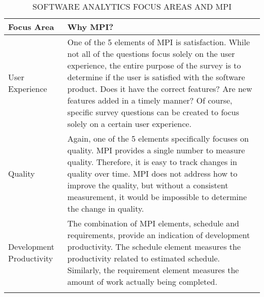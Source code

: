 \documentclass[SDSUThesis.tex]{subfiles}
\begin{document}
        \begin{longtable}{p{3cm}p{11cm}}
            
            \toprule%
             \centering%
             {\bfseries Focus Area}
             & {\bfseries Why MPI?} \\
            
            \cmidrule[0.4pt](r{0.125em}){1-1}%
            \cmidrule[0.4pt](lr{0.125em}){2-2}%
            \endhead
            
            User Experience & One of the 5 elements of MPI is satisfaction.  While not all of the questions focus solely on the user experience, the entire purpose of the survey is to determine if the user is satisfied
            with the software product. Does it have the correct features? Are new features added in a timely manner? Of course, specific survey questions can be created to focus solely on a certain user experience. \\
            \myrowcolour%
            Quality & Again, one of the 5 elements specifically focuses on quality.  MPI provides a single number
            to measure quality.  Therefore, it is easy to track changes in quality over time.  MPI does not address
            how to improve the quality, but without a consistent measurement, it would be impossible to determine the change in quality. \\
            Development Productivity & The combination of MPI elements, schedule and requirements, provide an 
            indication of development productivity. The schedule element measures the productivity
            related to estimated schedule. Similarly, the requirement element measures the amount of
            work actually being completed.  \\
            
            \bottomrule
            
            \caption{SOFTWARE ANALYTICS FOCUS AREAS AND MPI}
            \label{tab:focusareas}
        \end{longtable}
        
\end{document}
